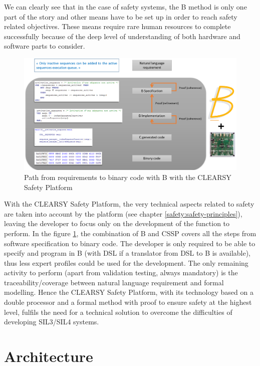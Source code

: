 We can clearly see that in the case of safety systems, the B method is only one part of the story and other means have to be set up in order to reach safety related objectives. These means require rare human resources to complete successfully because of the deep level of understanding of both hardware and software parts to consider. \\

\begin{figure}[h]
\centering\includegraphics[scale=0.3]{Pictures/chapterSafetyPrinciples/SAFETY-BCSSPcycle.png}
\caption{Path from requirements to binary code with B with the CLEARSY Safety Platform}
\label{safety:CSSP}
\end{figure}

With the CLEARSY Safety Platform, the very technical aspects related to safety are taken into account by the platform (see chapter \ref{safety:safety-principles}), leaving the developer to focus only on the development of the function to perform. In the figure \ref{safety:CSSP}, the combination of B and CSSP covers all the steps from software specification to binary code. The developer is only required to be able to specify and program in B (with DSL if a translator from DSL to B is available), thus less expert profiles could be used for the development. The only remaining activity to perform (apart from validation testing, always mandatory) is the traceability/coverage between natural language requirement and formal modelling. Hence the CLEARSY Safety Platform, with its technology based on a double processor and a formal method with proof to ensure safety at the highest level, fulfils the need for a technical solution to overcome the difficulties of developing SIL3/SIL4 systems.

\section{Architecture}

